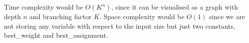 \documentclass[12pt]{article}
\begin{document}
\begin{enumerate}[label=(\alph*)]
    Time complexity would be $O(K^n)$, since it can be visualised as a graph with depth $n$ and branching factor $K$. Space complexity would be $O(1)$ since we are not storing any variable with respect to the input size but just two constants, best\_weight and best\_assignment.
    
    
    
    

\end{enumerate}
\end{document}
